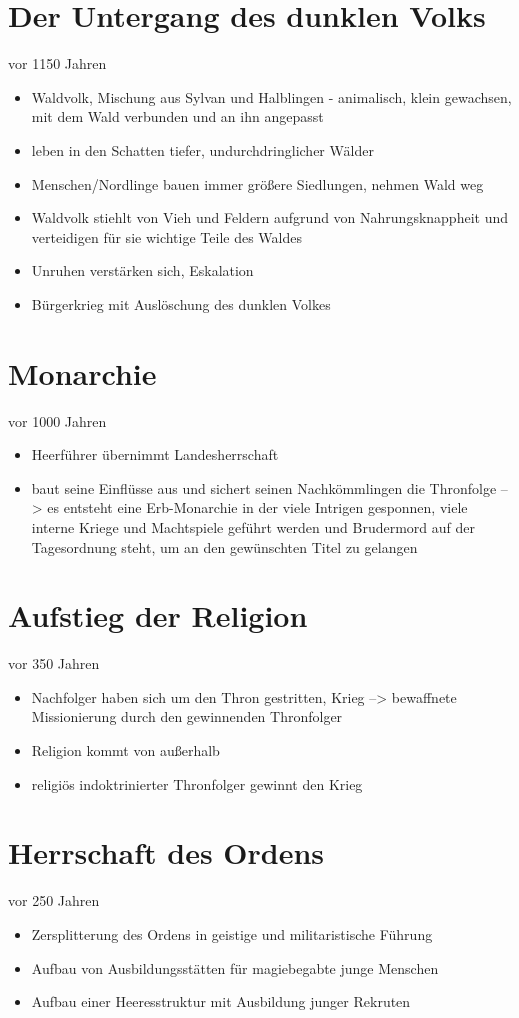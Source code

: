 \section{Der Untergang des dunklen Volks}
vor 1150 Jahren
\begin{itemize}
	\item Waldvolk, Mischung aus Sylvan und Halblingen - animalisch, klein gewachsen, mit dem Wald verbunden und an ihn angepasst
	\item leben in den Schatten tiefer, undurchdringlicher Wälder
	\item Menschen/Nordlinge bauen immer größere Siedlungen, nehmen Wald weg
	\item Waldvolk stiehlt von Vieh und Feldern aufgrund von Nahrungsknappheit und verteidigen für sie wichtige Teile des Waldes
	\item Unruhen verstärken sich, Eskalation
	\item Bürgerkrieg mit Auslöschung des dunklen Volkes
\end{itemize}

\section{Monarchie}
vor 1000 Jahren
\begin{itemize}
	\item Heerführer übernimmt Landesherrschaft
	\item baut seine Einflüsse aus und sichert seinen Nachkömmlingen die Thronfolge --> es entsteht eine Erb-Monarchie in der viele Intrigen gesponnen, viele interne Kriege und Machtspiele geführt werden und Brudermord auf der Tagesordnung steht, um an den gewünschten Titel zu gelangen
\end{itemize}

\section{Aufstieg der Religion}
vor 350 Jahren
\begin{itemize}
	\item Nachfolger haben sich um den Thron gestritten, Krieg --> bewaffnete Missionierung durch den gewinnenden Thronfolger
	\item Religion kommt von außerhalb
	\item religiös indoktrinierter Thronfolger gewinnt den Krieg
\end{itemize}

\section{Herrschaft des Ordens}
vor 250 Jahren
\begin{itemize}
	\item Zersplitterung des Ordens in geistige und militaristische Führung
	\item Aufbau von Ausbildungsstätten für magiebegabte junge Menschen
	\item Aufbau einer Heeresstruktur mit Ausbildung junger Rekruten
\end{itemize}

